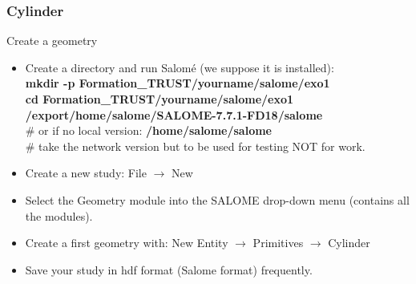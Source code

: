 \documentclass[10pt, hyperref={unicode=true,pdfusetitle, bookmarks=true,bookmarksnumbered=false,bookmarksopen=false, breaklinks=false,pdfborder={0 0 1},backref=true,colorlinks=true,linkcolor=darkblue,pageanchor}]{beamer}
\begin{document}
\begin{frame}
\frametitle{Cylinder}
\begin{block}{Create a geometry}

\begin{itemize}
\item Create a directory and run Salom\'e (we suppose it is installed):\\
\textbf{mkdir -p Formation\_TRUST/yourname/salome/exo1} \\
\textbf{cd Formation\_TRUST/yourname/salome/exo1} \\

\textbf{/export/home/salome/SALOME-7.7.1-FD18/salome} \\
\# or if no local version: {\scriptsize{\textbf{/home/salome/salome}}} \\
\# take the network version but to be used for testing NOT for work.

\item Create a new study: File $\rightarrow$ New

\item Select the Geometry module into the SALOME drop-down menu (contains all the modules).

\item Create a first geometry with: New Entity $\rightarrow$ Primitives $\rightarrow$ Cylinder
\item Save your study in hdf format (Salome format) frequently.
\end{itemize}

\end{block}
\end{frame}
\end{document}
